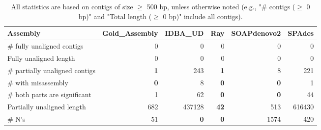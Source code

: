\documentclass[12pt,a4paper]{article}
\begin{document}
\begin{table}[ht]
\begin{center}
\caption{All statistics are based on contigs of size $\geq$ 500 bp, unless otherwise noted (e.g., "\# contigs ($\geq$ 0 bp)" and "Total length ($\geq$ 0 bp)" include all contigs).}
\begin{tabular}{|l*{5}{|r}|}
\hline
Assembly & Gold\_Assembly & IDBA\_UD & Ray & SOAPdenovo2 & SPAdes \\ \hline
\# fully unaligned contigs & 0 & 0 & 0 & 0 & 0 \\ \hline
Fully unaligned length & 0 & 0 & 0 & 0 & 0 \\ \hline
\# partially unaligned contigs & {\bf 1} & 243 & {\bf 1} & 8 & 221 \\ \hline
\hspace{5mm}\# with misassembly & {\bf 0} & 8 & {\bf 0} & {\bf 0} & 1 \\ \hline
\hspace{5mm}\# both parts are significant & 1 & 62 & {\bf 0} & {\bf 0} & 44 \\ \hline
Partially unaligned length & 682 & 437128 & {\bf 42} & 513 & 616430 \\ \hline
\# N's & 51 & {\bf 0} & {\bf 0} & 1574 & 420 \\ \hline
\end{tabular}
\end{center}
\end{table}
\end{document}
